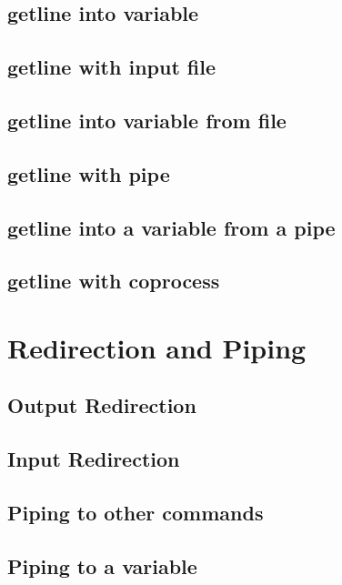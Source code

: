 \subsection{getline into variable}

\subsection{getline with input file}

\subsection{getline into variable from file}

\subsection{getline with pipe}

\subsection{getline into a variable from a pipe}

\subsection{getline with coprocess}

\section{Redirection and Piping}

\subsection{Output Redirection}

\subsection{Input Redirection}

\subsection{Piping to other commands}

\subsection{Piping to a variable}

